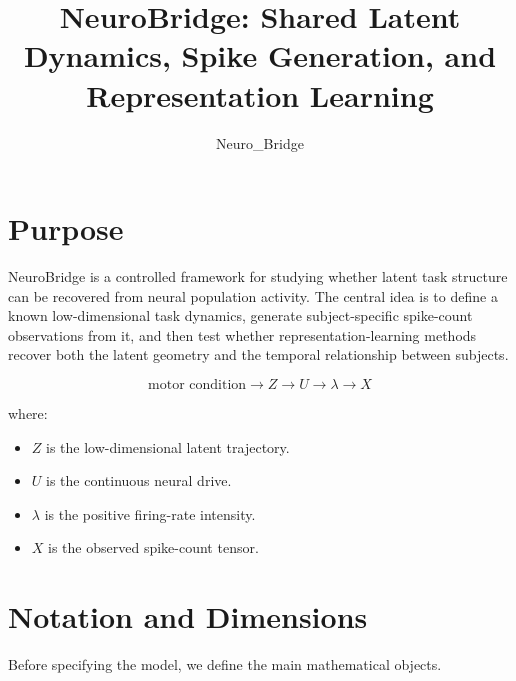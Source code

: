 \documentclass[11pt]{article}
\title{NeuroBridge: Shared Latent Dynamics, Spike Generation, and Representation Learning}
\author{Neuro\_Bridge}
\date{}
\begin{document}
\maketitle

\section{Purpose}

NeuroBridge is a controlled framework for studying whether latent task
structure can be recovered from neural population activity. The central idea is
to define a known low-dimensional task dynamics, generate subject-specific
spike-count observations from it, and then test whether representation-learning
methods recover both the latent geometry and the temporal relationship between
subjects.

\begin{equation}
\text{motor condition}
\rightarrow Z
\rightarrow U
\rightarrow \lambda
\rightarrow X
\end{equation}

where:

\begin{itemize}
    \item $Z$ is the low-dimensional latent trajectory.
    \item $U$ is the continuous neural drive.
    \item $\lambda$ is the positive firing-rate intensity.
    \item $X$ is the observed spike-count tensor.
\end{itemize}

\section{Notation and Dimensions}

Before specifying the model, we define the main mathematical objects.
\end{document}
